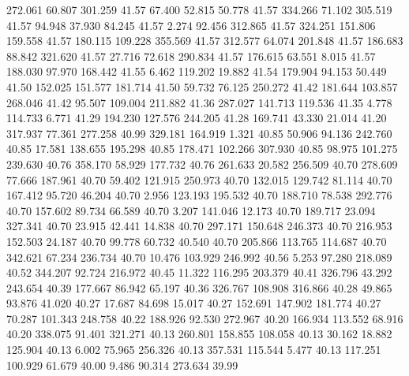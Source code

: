  272.061   60.807  301.259        41.57
  67.400   52.815   50.778        41.57
 334.266   71.102  305.519        41.57
  94.948   37.930   84.245        41.57
   2.274   92.456  312.865        41.57
 324.251  151.806  159.558        41.57
 180.115  109.228  355.569        41.57
 312.577   64.074  201.848        41.57
 186.683   88.842  321.620        41.57
  27.716   72.618  290.834        41.57
 176.615   63.551    8.015        41.57
 188.030   97.970  168.442        41.55
   6.462  119.202   19.882        41.54
 179.904   94.153   50.449        41.50
 152.025  151.577  181.714        41.50
  59.732   76.125  250.272        41.42
 181.644  103.857  268.046        41.42
  95.507  109.004  211.882        41.36
 287.027  141.713  119.536        41.35
   4.778  114.733    6.771        41.29
 194.230  127.576  244.205        41.28
 169.741   43.330   21.014        41.20
 317.937   77.361  277.258        40.99
 329.181  164.919    1.321        40.85
  50.906   94.136  242.760        40.85
  17.581  138.655  195.298        40.85
 178.471  102.266  307.930        40.85
  98.975  101.275  239.630        40.76
 358.170   58.929  177.732        40.76
 261.633   20.582  256.509        40.70
 278.609   77.666  187.961        40.70
  59.402  121.915  250.973        40.70
 132.015  129.742   81.114        40.70
 167.412   95.720   46.204        40.70
   2.956  123.193  195.532        40.70
 188.710   78.538  292.776        40.70
 157.602   89.734   66.589        40.70
   3.207  141.046   12.173        40.70
 189.717   23.094  327.341        40.70
  23.915   42.441   14.838        40.70
 297.171  150.648  246.373        40.70
 216.953  152.503   24.187        40.70
  99.778   60.732   40.540        40.70
 205.866  113.765  114.687        40.70
 342.621   67.234  236.734        40.70
  10.476  103.929  246.992        40.56
   5.253   97.280  218.089        40.52
 344.207   92.724  216.972        40.45
  11.322  116.295  203.379        40.41
 326.796   43.292  243.654        40.39
 177.667   86.942   65.197        40.36
 326.767  108.908  316.866        40.28
  49.865   93.876   41.020        40.27
  17.687   84.698   15.017        40.27
 152.691  147.902  181.774        40.27
  70.287  101.343  248.758        40.22
 188.926   92.530  272.967        40.20
 166.934  113.552   68.916        40.20
 338.075   91.401  321.271        40.13
 260.801  158.855  108.058        40.13
  30.162   18.882  125.904        40.13
   6.002   75.965  256.326        40.13
 357.531  115.544    5.477        40.13
 117.251  100.929   61.679        40.00
   9.486   90.314  273.634        39.99
